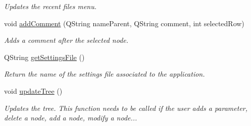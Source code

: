\begin{DoxyCompactItemize}
\begin{DoxyCompactList}\small\item\em Updates the recent files menu. \end{DoxyCompactList}\item 
void \hyperlink{classMainWindow_a00e35cdb432258d1e72a880ec8dd29f0}{add\-Comment} (Q\-String name\-Parent, Q\-String comment, int selected\-Row)
\begin{DoxyCompactList}\small\item\em Adds a comment after the selected node. \end{DoxyCompactList}\item 
Q\-String \hyperlink{classMainWindow_a976df6253f65334c295d515405f49a2a}{get\-Settings\-File} ()
\begin{DoxyCompactList}\small\item\em Return the name of the settings file associated to the application. \end{DoxyCompactList}\item 
\hypertarget{classMainWindow_adb079736c866c781e030899cd83e82ca}{void \hyperlink{classMainWindow_adb079736c866c781e030899cd83e82ca}{update\-Tree} ()}\label{classMainWindow_adb079736c866c781e030899cd83e82ca}

\begin{DoxyCompactList}\small\item\em Updates the tree. This function needs to be called if the user adds a parameter, delete a node, add a node, modify a node... \end{DoxyCompactList}\end{DoxyCompactItemize}
